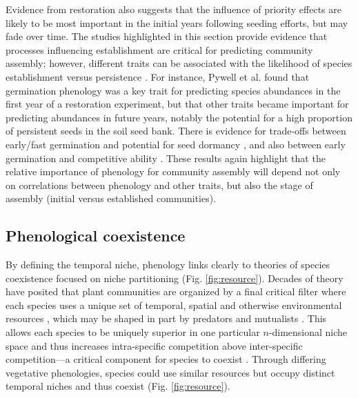 \documentclass[11pt]{article}
\newcommand{\R}[1]{\label{}\linelabel{#1}}
\begin{document}
\R{stage1} Evidence from restoration also suggests that the influence of priority effects are likely to be most important in the initial years following seeding efforts, but may fade over time. The studies highlighted in this section provide evidence that processes influencing establishment are critical for predicting community assembly; however, different traits can be associated with the likelihood of species establishment versus persistence \citep{larson2016regeneration}. For instance, Pywell et al. \citet{pywell2003plant} found that germination phenology was a key trait for predicting species abundances in the first year of a restoration experiment, but that other traits became important for predicting abundances in future years, notably the potential for a high proportion of persistent seeds in the soil seed bank. There is evidence for trade-offs between early/fast germination and potential for seed dormancy \citep{waterton2021trade}, and also between early germination and competitive ability \citep{kraft2015community}. These results again highlight that the relative importance of phenology for community assembly will depend not only on correlations between phenology and other traits, but also the stage of assembly (initial versus established communities).\R{stage2} 

\subsection*{Phenological coexistence}

By defining the temporal niche, phenology links clearly to theories of species coexistence focused on niche partitioning \R{reffig1}(Fig. \ref{fig:resource}). Decades of theory have posited that plant communities are organized by a final critical filter where each species uses a unique set of temporal, spatial and otherwise environmental resources \citep{Hutchinson:1959xi}, which may be shaped in part by predators and mutualists \citep{mcpeek2022coexistence}. This allows each species to be uniquely superior in one particular $n$-dimensional niche space and thus increases intra-specific competition above inter-specific competition---a critical component for species to coexist \citep{Chesson:2000vd,hillerislambers2012rethinking,mcpeek2022coexistence}. Through differing vegetative phenologies, species could use similar resources but occupy distinct temporal niches and thus coexist (Fig. \ref{fig:resource}). 
\end{document}
